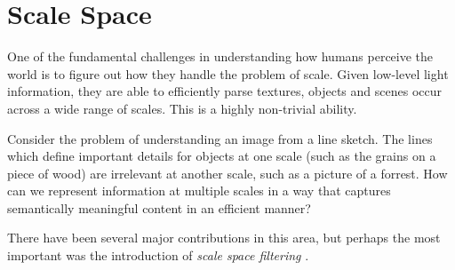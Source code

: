 \chapter{Scale Space} \label{chap:scale-space}

One of the fundamental challenges in understanding how humans perceive the world is to figure out how they handle the problem of scale.  Given low-level light information, they are able to efficiently parse textures, objects and scenes occur across a wide range of scales.  This is a highly non-trivial ability.  

Consider the problem of understanding an image from a line sketch.  The lines which define important details for objects at one scale (such as the grains on a piece of wood) are irrelevant at another scale, such as a picture of a forrest.  How can we represent information at multiple scales in a way that captures semantically meaningful content in an efficient manner?

There have been several major contributions in this area, but perhaps the most important was the introduction of \textit{scale space filtering} \cite{witkin1987scale}.